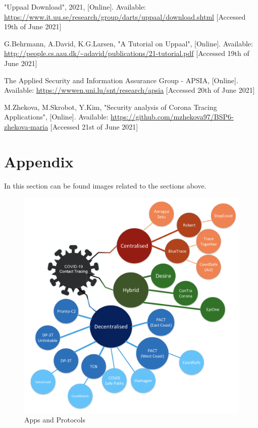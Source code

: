 \documentclass[a4paper, twocolumn]{article}
\begin{document}
\begin{thebibliography}{9}
"Uppaal Download", 2021, [Online]. Available: \url{https://www.it.uu.se/research/group/darts/uppaal/download.shtml} [Accessed 19th of June 2021]

G.Behrmann, A.David, K.G.Larsen, "A Tutorial on Uppaal", [Online]. Available: \url{http://people.cs.aau.dk/~adavid/publications/21-tutorial.pdf} [Accessed 19th of June 2021]

The Applied Security and Information Assurance Group - APSIA, [Online]. Available: \url{https://wwwen.uni.lu/snt/research/apsia} [Accessed 20th of June 2021]

M.Zhekova, M.Skrobot, Y.Kim, "Security analysis of Corona Tracing Applications", [Online]. Available:  \url{https://github.com/mzhekova97/BSP6-zhekova-maria} [Accessed 21st of June 2021]

\end{thebibliography}
\newpage 
\section{Appendix}
In this section can be found images related to the sections above.

\begin{figure}[h]
    \centering
    \includegraphics[scale=0.425]{images/protocolsApps.png}
    \caption{Apps and Protocols}
    \label{fig:setProt}
\end{figure}
\end{document}
